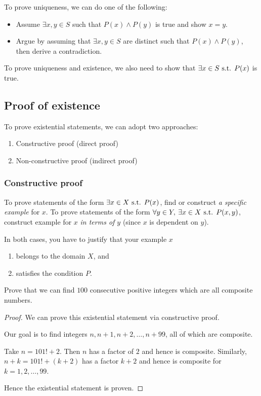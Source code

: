 To prove uniqueness, we can do one of the following:
\begin{itemize}
\item Assume $\exists x,y \in S$ such that $P(x) \land P(y)$ is true and show $x=y$.
\item Argue by assuming that $\exists x,y \in S$ are distinct such that $P(x) \land P(y)$, then derive a contradiction.
\end{itemize}
To prove uniqueness and existence, we also need to show that $\exists x \in S \text{ s.t. } P(x)$ is true.

\subsection{Proof of existence}
To prove existential statements, we can adopt two approaches:
\begin{enumerate}
\item Constructive proof (direct proof)
\item Non-constructive proof (indirect proof)
\end{enumerate}

\subsubsection{Constructive proof}
To prove statements of the form $\exists x\in X \text{ s.t. } P(x)$, find or construct \emph{a specific example} for $x$. To prove statements of the form $\forall y\in Y,\:\exists x\in X\text{ s.t. } P(x,y)$, construct example for $x$ \emph{in terms of $y$} (since $x$ is dependent on $y$).

In both cases, you have to justify that your example $x$
\begin{enumerate}
\item belongs to the domain $X$, and
\item satisfies the condition $P$.
\end{enumerate}

\begin{exercise}
Prove that we can find $100$ consecutive positive integers which are all composite numbers.
\end{exercise}

\begin{proof}
We can prove this existential statement via constructive proof.

Our goal is to find integers $n,n+1,n+2,\dots,n+99$, all of which are composite.

Take $n=101!+2$. Then $n$ has a factor of $2$ and hence is composite. Similarly, $n+k=101!+(k+2)$ has a factor $k+2$ and hence is composite for $k=1,2,\dots,99$.

Hence the existential statement is proven.
\end{proof}

